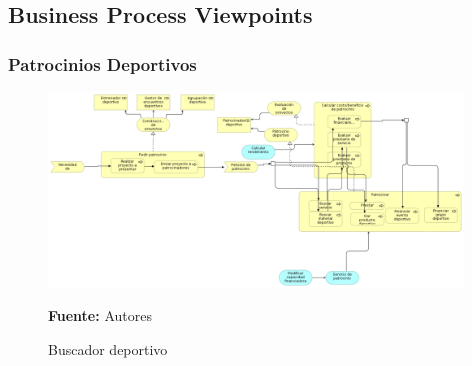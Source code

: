 \subsection{Business Process Viewpoints}

\subsubsection{Patrocinios Deportivos}

\begin{figure}[!htb]
  \begin{center}
    \includegraphics[width=11cm]{./imagenes/business_process/patrociniosdeportivos.png}
    \caption{Buscador deportivo}
    \label{fig:BF_BuscadorDeportivo}
    \textbf{Fuente:}  Autores
  \end{center}
\end{figure}

